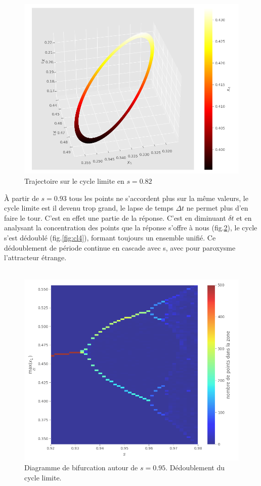 \documentclass{wsdcr}
\begin{document}
 \begin{figure}
    \centering
    \includegraphics[width=\linewidth]{fig/lv4_1cl4.png}
    \caption{Trajectoire sur le cycle limite en $s=0.82$}
    \label{fig:1cl4}
\end{figure}
À partir de $s=0.93$ tous les points ne s'accordent plus sur la même valeurs, le cycle limite est il devenu trop grand, le lapse de temps $\Delta t$ ne permet plus d'en faire le tour. C'est en effet une partie de la réponse. C'est en diminuant $\delta t$ et en analysant la concentration des points que la réponse s'offre à nous (fig.\ref{fig:bifz}), le cycle s'est dédoublé (fig.\ref{fig:cl4}), formant toujours un ensemble unifié. Ce dédoublement de période continue en cascade avec s, avec pour paroxysme l'attracteur étrange.  \\ \\
\begin{figure}
    \centering
    \includegraphics[width=\linewidth]{fig/lv4_bifz.png}
    \caption{Diagramme de bifurcation autour de $s=0.95$. Dédoublement du cycle limite.}
    \label{fig:bifz}
\end{figure}
\end{document}
